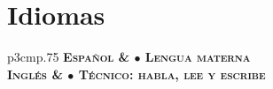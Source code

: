 
\section{{Idiomas}}

\begin{tabular}{p{3cm}p{.75\linewidth}}
\hfill\bfseries\scshape Espa\~nol & $\bullet$ Lengua materna\\
\hfill\bfseries\scshape Ingl\'es & $\bullet$ T\'ecnico: habla, lee y escribe%
\end{tabular}